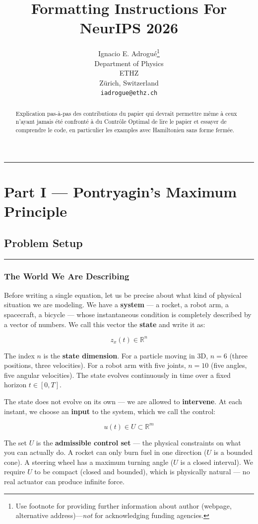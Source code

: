 \documentclass{article}
\title{Formatting Instructions For NeurIPS 2026}
\author{%
  Ignacio E. Adrogué\thanks{Use footnote for providing further information
    about author (webpage, alternative address)---\emph{not} for acknowledging
    funding agencies.} \\
  Department of Physics\\
  ETHZ\\
  Zürich, Switzerland \\
  \texttt{iadrogue@ethz.ch} \\
}
\begin{document}
\maketitle

\setcounter{tocdepth}{3}
\tableofcontents
\medskip\hrule\medskip

\begin{abstract}
  Explication pas-à-pas des contributions du papier qui devrait permettre même à ceux n'ayant jamais été confronté à du Contrôle Optimal de lire le papier et essayer de comprendre le code, en particulier les examples avec Hamiltonien sans forme fermée. 
\end{abstract}


\section{Part I --- Pontryagin's Maximum Principle}

\subsection{Problem Setup}
\label{sec:problem-setup}

\medskip\hrule\medskip

\subsubsection{The World We Are Describing}

Before writing a single equation, let us be precise about what kind of physical situation we are modeling. We have a \textbf{system} — a rocket, a robot arm, a spacecraft, a bicycle — whose instantaneous condition is completely described by a vector of numbers. We call this vector the \textbf{state} and write it as:

$$z_x(t) \in \mathbb{R}^n$$

The index $n$ is the \textbf{state dimension}. For a particle moving in 3D, $n = 6$ (three positions, three velocities). For a robot arm with five joints, $n = 10$ (five angles, five angular velocities). The state evolves continuously in time over a fixed horizon $t \in [0, T]$.

The state does not evolve on its own — we are allowed to \textbf{intervene}. At each instant, we choose an \textbf{input} to the system, which we call the control:

$$u(t) \in U \subset \mathbb{R}^m$$

The set $U$ is the \textbf{admissible control set} — the physical constraints on what you can actually do. A rocket can only burn fuel in one direction ($U$ is a bounded cone). A steering wheel has a maximum turning angle ($U$ is a closed interval). We require $U$ to be compact (closed and bounded), which is physically natural — no real actuator can produce infinite force.
\end{document}
